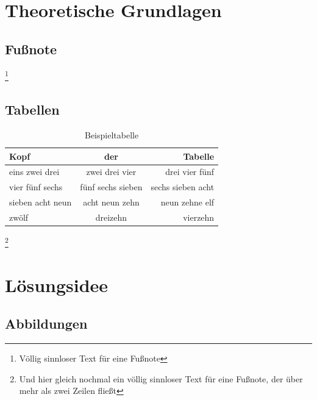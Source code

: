 \chapter{Theoretische Grundlagen}
\section{Fußnote}
\blindtext\footnote{Völlig sinnloser Text für eine Fußnote}

\blindtext
\section{Tabellen}

\begin{table}[ht]
 \caption{Beispieltabelle}
 \label{tab:beispiel}
 \centering
 \begin{tabular}{lcr}\toprule
   Kopf & der & Tabelle \\\midrule
   eins zwei drei & zwei drei vier & drei vier fünf \\
   vier fünf sechs& fünf sechs sieben& sechs sieben acht\\
   sieben acht neun& acht neun zehn & neun zehne elf \\
   zwölf & dreizehn & vierzehn \\\bottomrule
 \end{tabular}
\end{table}

\blindtext\footnote{Und hier gleich nochmal ein völlig sinnloser Text für eine Fußnote, der über mehr als zwei Zeilen fließt}

\chapter{Lösungsidee}
\section{Abbildungen}
\blindtext

